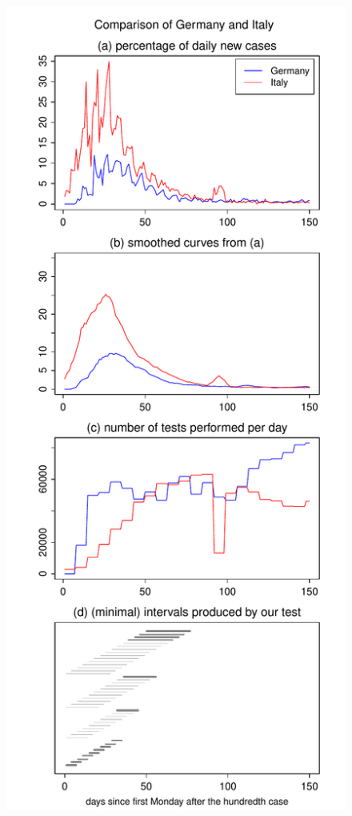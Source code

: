 \documentclass[a4paper,12pt]{article}
\numberwithin{equation}{section}
\begin{document}
\begin{figure}[h!]
\begin{minipage}[t]{0.49\textwidth}
\includegraphics[width=\textwidth]{plots/DEU_vs_ITA_normalised}

\end{minipage}
\end{figure}
\end{document}
